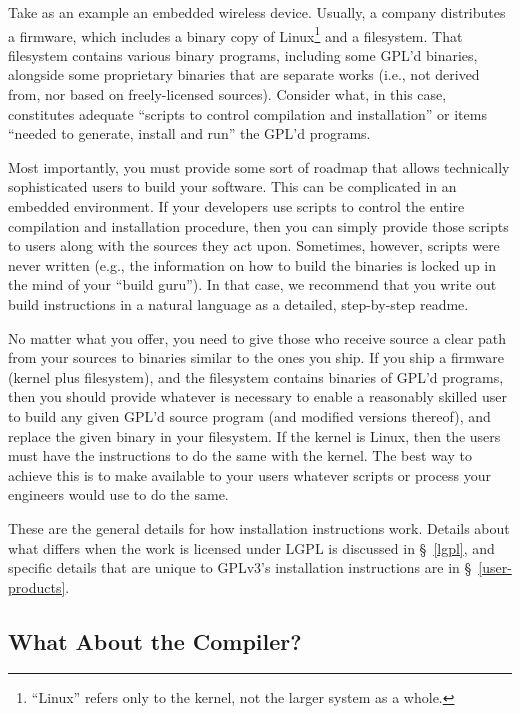 Take as an example an embedded wireless device.  Usually, a company
distributes a firmware, which includes a binary copy of
Linux\footnote{``Linux'' refers only to the kernel, not the larger system
  as a whole.} and a filesystem.  That filesystem contains various binary
programs, including some GPL'd binaries, alongside some proprietary
binaries that are separate works (i.e., not derived from, nor based on
freely-licensed sources).  Consider what, in this case, constitutes adequate
``scripts to control compilation and installation'' or items ``needed to
generate, install and run'' the GPL'd programs.

Most importantly, you must provide some sort of roadmap that allows
technically sophisticated users to build your software.  This can be
complicated in an embedded environment.  If your developers use scripts to
control the entire compilation and installation procedure, then you can
simply provide those scripts to users along with the sources they act
upon.  Sometimes, however, scripts were never written (e.g., the
information on how to build the binaries is locked up in the mind of your
``build guru'').  In that case, we recommend that you write out build
instructions in a natural language as a detailed, step-by-step {\sc
  readme}.

No matter what you offer, you need to give those who receive source a
clear path from your sources to binaries similar to the ones you ship.  If
you ship a firmware (kernel plus filesystem), and the filesystem contains
binaries of GPL'd programs, then you should provide whatever is necessary
to enable a reasonably skilled user to build any given GPL'd source
program (and modified versions thereof), and replace the given binary in
your filesystem.  If the kernel is Linux, then the users must have the
instructions to do the same with the kernel.  The best way to achieve this
is to make available to your users whatever scripts or process your
engineers would use to do the same.

These are the general details for how installation instructions work.
Details about what differs when the work is licensed under LGPL is
discussed in \S~\ref{lgpl}, and specific details that are unique to
GPLv3's installation instructions are in \S~\ref{user-products}.

\subsection{What About the Compiler?}

